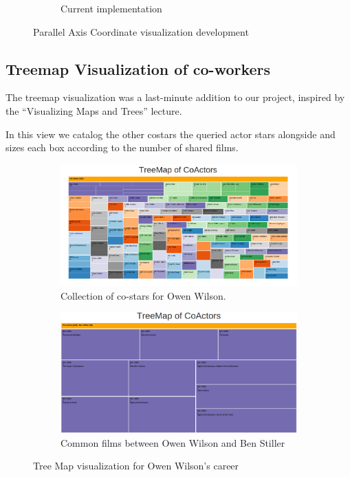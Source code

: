 \documentclass[12pt]{article}
\begin{document}
\begin{figure}[h!]
\begin{subfigure}[t]{.6\textwidth}
			  \caption{Current implementation}
			  \label{fig:sub2}
		\end{subfigure}%
		\caption{Parallel Axis Coordinate visualization development}
		\label{fig:parallelAxisCoordVis}
	\end{figure}


\newpage 

\subsection{Treemap Visualization of co-workers}

The treemap visualization was a last-minute addition to our project, inspired by the ``Visualizing Maps and Trees'' lecture.

In this view we catalog the other costars the queried actor stars alongside and sizes each box according to the number of shared films.
	\begin{figure}[h!]
		\centering
		\begin{subfigure}[t]{.5\textwidth}
		  \centering
		  \includegraphics[width=\linewidth]{images/treemapOwenWilson.png}
		  \caption{Collection of co-stars for Owen Wilson.}
		  \label{fig:treemapA}
		\end{subfigure}%
		\begin{subfigure}[t]{.5\textwidth}
		  \centering
		  \includegraphics[width=.9\linewidth]{images/treemapZoomWilson.png}
		  \caption{Common films between Owen Wilson and Ben Stiller}
		  \label{fig:treemapB}
		\end{subfigure}%
		\caption{Tree Map visualization for Owen Wilson's career}
		\label{fig:Treemap}
	\end{figure}
		
\end{document}
